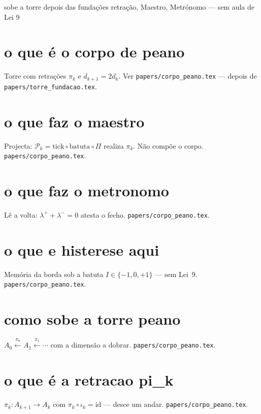 \documentclass[11pt,a4paper]{article}
\newcommand{\code}[1]{\texttt{\small #1}}
\begin{document}
       {sobe a torre depois das fundações}
       {retração, Maestro, Metrónomo --- sem aula de Lei 9}
\maketitle
\begin{abstract}
Pares curtos para o próximo andar da escada.
Fundação primeiro: \code{papers/torre\_fundacao.tex}.
Detalhe: \code{papers/corpo\_peano.tex}.
\end{abstract}

\section{o que é o corpo de peano}
Torre com retrações $\pi_k$ e $d_{k+1}=2d_k$.
Ver \code{papers/corpo\_peano.tex} --- depois de \code{papers/torre\_fundacao.tex}.

\section{o que faz o maestro}
Projecta: $\mathcal{P}_k=\mathrm{tick}\circ\mathrm{batuta}\circ\Pi$ realiza $\pi_k$.
Não compõe o corpo. \code{papers/corpo\_peano.tex}.

\section{o que faz o metronomo}
Lê a volta: $\lambda^{+}+\lambda^{-}=0$ atesta o fecho.
\code{papers/corpo\_peano.tex}.

\section{o que e histerese aqui}
Memória da borda sob a batuta $I\in\{-1,0,+1\}$ --- sem Lei~9.
\code{papers/corpo\_peano.tex}.

\section{como sobe a torre peano}
$A_0\xleftarrow{\pi_0}A_1\xleftarrow{\pi_1}\cdots$ com a dimensão a dobrar.
\code{papers/corpo\_peano.tex}.

\section{o que é a retracao pi\_k}
$\pi_k\colon A_{k+1}\to A_k$ com $\pi_k\circ\iota_k=\mathrm{id}$ --- desce um andar.
\code{papers/corpo\_peano.tex}.
\end{document}
